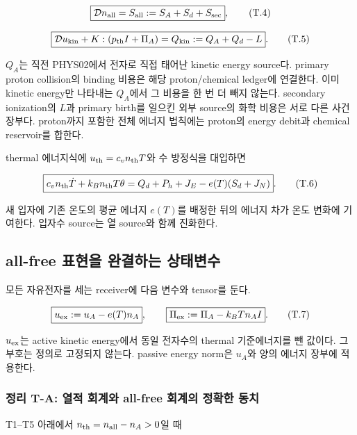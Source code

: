 \documentclass[11pt,a4paper]{article}
\begin{document}
\[
\boxed{\mathcal D n_{\rm all}=S_{\rm all}:=S_A+S_d+S_{\rm sec}},
\tag{T.4}
\]

\[
\boxed{\mathcal D u_{\rm kin}
+K:(p_{\rm th}I+\Pi_A)=Q_{\rm kin}:=Q_A+Q_d-L}.
\tag{T.5}
\]

\(Q_A\)는 직전 PHYS02에서 전자로 직접 태어난 kinetic energy source다. primary proton collision의 binding 비용은 해당 proton/chemical ledger에 연결한다. 이미 kinetic energy만 나타내는 \(Q_A\)에서 그 비용을 한 번 더 빼지 않는다. secondary ionization의 \(L\)과 primary birth를 일으킨 외부 source의 화학 비용은 서로 다른 사건 장부다. proton까지 포함한 전체 에너지 법칙에는 proton의 energy debit과 chemical reservoir를 합한다.

thermal 에너지식에 \(u_{\rm th}=c_vn_{\rm th}T\)와 수 방정식을 대입하면

\[
\boxed{c_vn_{\rm th}\dot T+k_Bn_{\rm th}T\theta
=Q_d+P_h+J_E-e(T)(S_d+J_N)}.
\tag{T.6}
\]

새 입자에 기존 온도의 평균 에너지 \(e(T)\)를 배정한 뒤의 에너지 차가 온도 변화에 기여한다. 입자수 source는 열 source와 함께 진화한다.

\hypertarget{all-free-uxd45cuxd604uxc744-uxc644uxacb0uxd558uxb294-uxc0c1uxd0dcuxbcc0uxc218}{%
\subsection{all-free 표현을 완결하는 상태변수}\label{all-free-uxd45cuxd604uxc744-uxc644uxacb0uxd558uxb294-uxc0c1uxd0dcuxbcc0uxc218}}

모든 자유전자를 세는 receiver에 다음 변수와 tensor를 둔다.

\[
\boxed{u_{\rm ex}:=u_A-e(T)n_A},\qquad
\boxed{\Pi_{\rm ex}:=\Pi_A-k_BTn_AI}.
\tag{T.7}
\]

\(u_{\rm ex}\)는 active kinetic energy에서 동일 전자수의 thermal 기준에너지를 뺀 값이다. 그 부호는 정의로 고정되지 않는다. passive energy norm은 \(u_A\)와 양의 에너지 장부에 적용한다.

\hypertarget{uxc815uxb9ac-t-a-uxc5f4uxc801-uxd68cuxacc4uxc640-all-free-uxd68cuxacc4uxc758-uxc815uxd655uxd55c-uxb3d9uxce58}{%
\subsubsection{정리 T-A: 열적 회계와 all-free 회계의 정확한 동치}\label{uxc815uxb9ac-t-a-uxc5f4uxc801-uxd68cuxacc4uxc640-all-free-uxd68cuxacc4uxc758-uxc815uxd655uxd55c-uxb3d9uxce58}}

T1--T5 아래에서 \(n_{\rm th}=n_{\rm all}-n_A>0\)일 때
\end{document}
